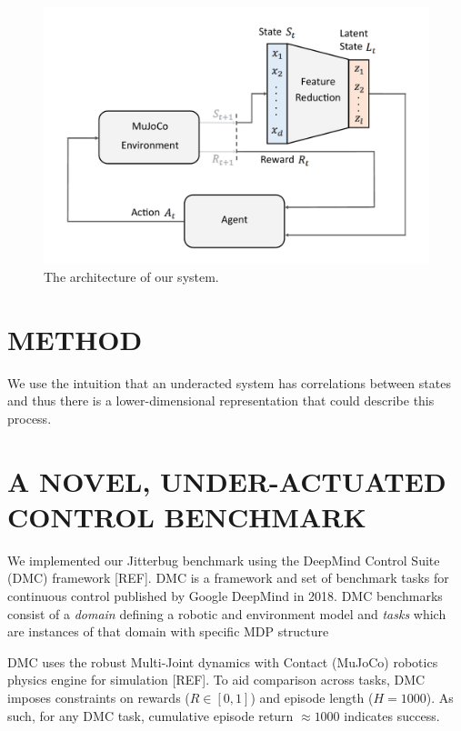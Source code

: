 \documentclass[letterpaper, 10 pt, conference]{ieeeconf}
\begin{document}
\begin{figure}[ht]
    \centering
    \includegraphics[width=\linewidth]{fig-system-arch}
    \caption{
        The architecture of our system.
    }
    \label{fig:system-arch}
\end{figure}

\section{METHOD}

We use the intuition that an underacted system has correlations between states %
and thus there is a lower-dimensional representation that could describe this process.  

\lipsum[1-4]

\section{A NOVEL, UNDER-ACTUATED CONTROL BENCHMARK}

We implemented our Jitterbug benchmark using the DeepMind Control Suite (DMC) framework [REF].
DMC is a framework and set of benchmark tasks for continuous control published by Google DeepMind in 2018.
DMC benchmarks consist of a \emph{domain} defining a robotic and environment model and \emph{tasks} which are instances of that domain with specific MDP structure

DMC uses the robust Multi-Joint dynamics with Contact (MuJoCo) robotics physics engine for simulation [REF].
To aid comparison across tasks, DMC imposes constraints on rewards ($R \in [0, 1]$) and episode length ($H = 1000$).
As such, for any DMC task, cumulative episode return $\approx 1000$ indicates success.
\end{document}
